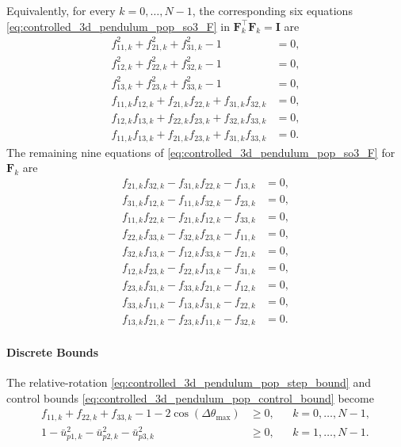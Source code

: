 Equivalently, for every \(k=0,\ldots,N-1\), the corresponding six equations \eqref{eq:controlled_3d_pendulum_pop_so3_F} in
\(\bm{F}_k^{\top}\bm{F}_k=\bm{I}\) are
\begin{subequations}
\label{eq:app_3d_scalar_F_orthogonality}
\begin{align}
f_{11,k}^2+f_{21,k}^2+f_{31,k}^2-1&=0,\\
f_{12,k}^2+f_{22,k}^2+f_{32,k}^2-1&=0,\\
f_{13,k}^2+f_{23,k}^2+f_{33,k}^2-1&=0,\\
f_{11,k}f_{12,k}+f_{21,k}f_{22,k}+f_{31,k}f_{32,k}&=0,\\
f_{12,k}f_{13,k}+f_{22,k}f_{23,k}+f_{32,k}f_{33,k}&=0,\\
f_{11,k}f_{13,k}+f_{21,k}f_{23,k}+f_{31,k}f_{33,k}&=0.
\end{align}
\end{subequations}
The remaining nine equations of \eqref{eq:controlled_3d_pendulum_pop_so3_F} for \(\bm{F}_k\) are
\begin{subequations}
\label{eq:app_3d_scalar_F_right_handedness}
\begin{align}
f_{21,k}f_{32,k}-f_{31,k}f_{22,k}-f_{13,k}&=0,\\
f_{31,k}f_{12,k}-f_{11,k}f_{32,k}-f_{23,k}&=0,\\
f_{11,k}f_{22,k}-f_{21,k}f_{12,k}-f_{33,k}&=0,\\
f_{22,k}f_{33,k}-f_{32,k}f_{23,k}-f_{11,k}&=0,\\
f_{32,k}f_{13,k}-f_{12,k}f_{33,k}-f_{21,k}&=0,\\
f_{12,k}f_{23,k}-f_{22,k}f_{13,k}-f_{31,k}&=0,\\
f_{23,k}f_{31,k}-f_{33,k}f_{21,k}-f_{12,k}&=0,\\
f_{33,k}f_{11,k}-f_{13,k}f_{31,k}-f_{22,k}&=0,\\
f_{13,k}f_{21,k}-f_{23,k}f_{11,k}-f_{32,k}&=0.
\end{align}
\end{subequations}

\paragraph{Discrete Bounds}

The relative-rotation \eqref{eq:controlled_3d_pendulum_pop_step_bound} and control bounds
\eqref{eq:controlled_3d_pendulum_pop_control_bound} become
\begin{subequations}
\label{eq:app_3d_scalar_bounds}
\begin{align}
f_{11,k}+f_{22,k}+f_{33,k}-1
-2\cos(\Delta\theta_{\max})&\geq0,
&&k=0,\ldots,N-1,
\\
1-\bar u_{p1,k}^2-\bar u_{p2,k}^2-\bar u_{p3,k}^2&\geq0,
&&k=1,\ldots,N-1.
\end{align}
\end{subequations}

